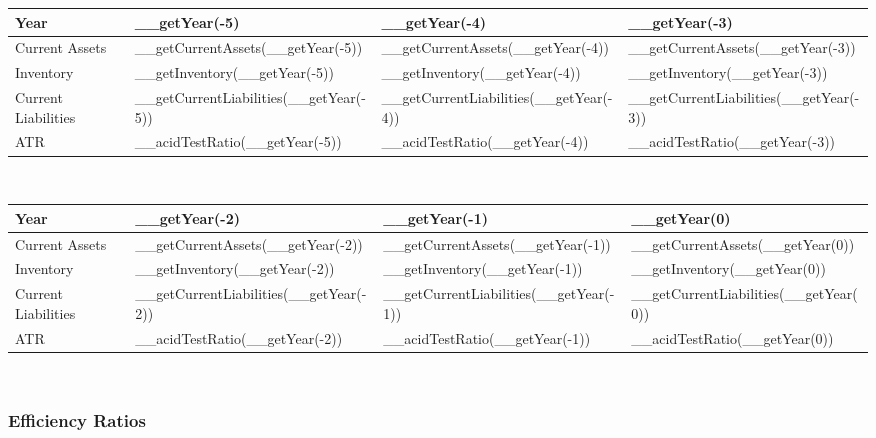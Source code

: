 \begin{tabularx}{\textwidth}{|X|X|X|X|}
 \hline
 Year                     & __getYear(-5)                          & __getYear(-4)                          & __getYear(-3)                          \\
 \hline
 Current Assets           & __getCurrentAssets(__getYear(-5))      & __getCurrentAssets(__getYear(-4))      & __getCurrentAssets(__getYear(-3))      \\
 Inventory                & __getInventory(__getYear(-5))          & __getInventory(__getYear(-4))          & __getInventory(__getYear(-3))          \\
 Current Liabilities      & __getCurrentLiabilities(__getYear(-5)) & __getCurrentLiabilities(__getYear(-4)) & __getCurrentLiabilities(__getYear(-3)) \\
 \rowcolor{lightgray} ATR & __acidTestRatio(__getYear(-5))         & __acidTestRatio(__getYear(-4))         & __acidTestRatio(__getYear(-3))         \\
 \hline
\end{tabularx}\\

\begin{tabularx}{\textwidth}{|X|X|X|X|}
 \hline
 Year                     & __getYear(-2)                          & __getYear(-1)                          & __getYear(0)                          \\
 \hline
 Current Assets           & __getCurrentAssets(__getYear(-2))      & __getCurrentAssets(__getYear(-1))      & __getCurrentAssets(__getYear(0))      \\
 Inventory                & __getInventory(__getYear(-2))          & __getInventory(__getYear(-1))          & __getInventory(__getYear(0))          \\
 Current Liabilities      & __getCurrentLiabilities(__getYear(-2)) & __getCurrentLiabilities(__getYear(-1)) & __getCurrentLiabilities(__getYear(0)) \\
 \rowcolor{lightgray} ATR & __acidTestRatio(__getYear(-2))         & __acidTestRatio(__getYear(-1))         & __acidTestRatio(__getYear(0))         \\
 \hline
\end{tabularx}\\

\subsubsection{Efficiency Ratios}


